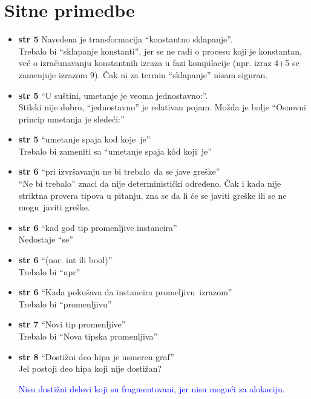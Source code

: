 \documentclass[a4paper]{report}
\newcommand{\odgovor}[1]{\textcolor{blue}{#1}}
\begin{document}
\section{Sitne primedbe}
\begin{itemize}
\item \textbf{str 5} Navedena je transformacija ``konstantno sklapanje''.\\Trebalo bi ``sklapanje konstanti'', jer se ne radi o procesu koji je konstantan, već o izračunavanju konstantnih izraza u fazi kompilacije (npr. izraz 4+5 se zamenjuje izrazom 9). Čak ni za termin ``sklapanje'' nisam siguran.
\item \textbf{str 5} ``U suštini, umetanje je veoma jednostavno:''.\\ Stilski nije dobro, ``jednostavno'' je relativan pojam. Možda je bolje ``Osnovni princip umetanja je sledeći:''
\item \textbf{str 5} ``umetanje spaja \color{blue}kod koje\color{black}~je''\\ Trebalo bi zameniti sa ``umetanje spaja \color{blue}kôd koji\color{black}~je''
\item \textbf{str 6} ``pri izvršavanju \color{blue}ne bi trebalo\color{black}~da se jave greške'' \\ ``Ne bi trebalo'' znaci da nije deterministički određeno. Čak i kada nije striktna provera tipova u pitanju, zna se da li će se javiti greške ili se \color{blue}ne mogu\color{black}~javiti greške.
\item \textbf{str 6} ``kad god tip promenljive instancira'' \\ Nedostaje ``se''
\item \textbf{str 6} ``(\color{blue}nor\color{black}. int ili bool)'' \\ Trebalo bi ``npr''
\item \textbf{str 6} ``Kada pokušava da instancira \color{blue}promeljivu\color{black}~izrazom'' \\ Trebalo bi ``promenljivu''
\item \textbf{str 7} ``Novi tip promenljive'' \\ Trebalo bi ``Nova tipska promenljiva''
\item \textbf{str 8} ``Dostižni deo hipa je usmeren graf'' \\ Jel postoji deo hipa koji nije dostižan?

\odgovor{Nisu dostižni delovi koji su fragmentovani, jer nisu mogući za alokaciju.}


\end{itemize}
\end{document}
